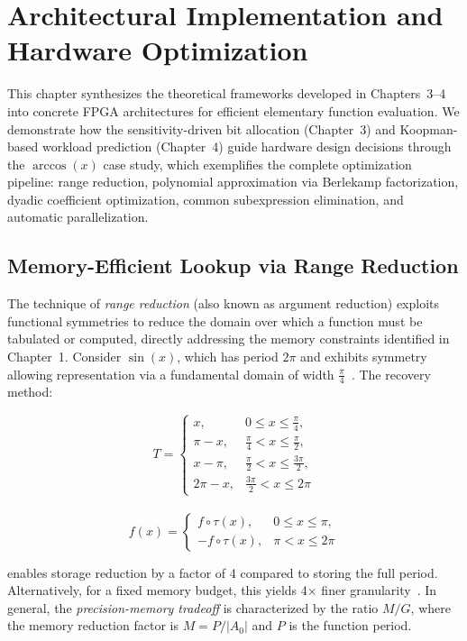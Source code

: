 \chapter{Architectural Implementation and Hardware Optimization}

This chapter synthesizes the theoretical frameworks developed in Chapters~3--4 into concrete FPGA architectures for efficient elementary function evaluation. We demonstrate how the sensitivity-driven bit allocation (Chapter~3) and Koopman-based workload prediction (Chapter~4) guide hardware design decisions through the $\arccos(x)$ case study, which exemplifies the complete optimization pipeline: range reduction, polynomial approximation via Berlekamp factorization, dyadic coefficient optimization, common subexpression elimination, and automatic parallelization.

\section{Memory-Efficient Lookup via Range Reduction}

The technique of \emph{range reduction} (also known as argument reduction) exploits functional symmetries to reduce the domain over which a function must be tabulated or computed, directly addressing the memory constraints identified in Chapter~1. Consider $\sin(x)$, which has period $2\pi$ and exhibits symmetry allowing representation via a fundamental domain of width $\frac{\pi}{4}$~\cite{Muller2006}. The recovery method:

\[
T =
\begin{cases}
	x, & 0 \leq x \leq \frac{\pi}{4},\\[6pt]
	\pi - x, & \frac{\pi}{4} < x \leq \frac{\pi}{2},\\[6pt]
	x - \pi, & \frac{\pi}{2} < x \leq \frac{3\pi}{2},\\[6pt]
	2\pi - x, & \frac{3\pi}{2} < x \leq 2\pi
\end{cases}
\]\\

\[
f(x) =
\begin{cases}
	f \circ \tau(x), & 0 \leq x \leq \pi,\\[6pt]
	-f \circ \tau(x), & \pi < x \leq 2\pi
\end{cases}
\]

enables storage reduction by a factor of 4 compared to storing the full period. Alternatively, for a fixed memory budget, this yields 4× finer granularity~\cite{Andraka1998,Volder1959}. In general, the \emph{precision-memory tradeoff} is characterized by the ratio $M/G$, where the memory reduction factor is $M = P/|A_0|$ and $P$ is the function period.


